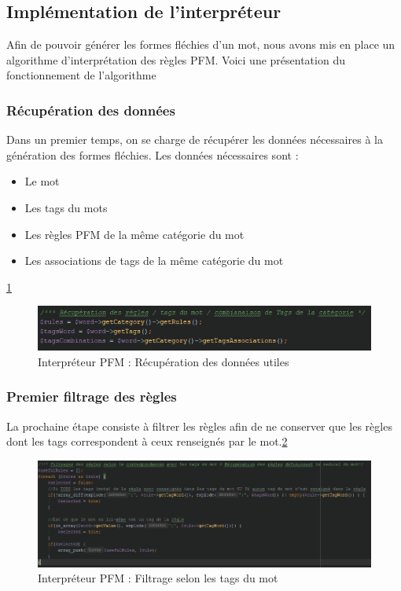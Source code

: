 \documentclass[12pt,a4paper]{article}
\begin{document}
\subsection{Implémentation de l'interpréteur}

Afin de pouvoir générer les formes fléchies d'un mot, nous avons mis en place un algorithme d'interprétation des règles PFM.
Voici une présentation du fonctionnement de l'algorithme

\subsubsection{Récupération des données}
Dans un premier temps, on se charge de récupérer les données nécessaires à la génération des formes fléchies.
Les données nécessaires sont : 
\begin{itemize} 
\item Le mot
\item Les tags du mots
\item Les règles PFM de la même catégorie du mot
\item Les associations de tags de la même catégorie du mot
\end{itemize}
\ref{PFM1}
\smallbreak

\begin{figure}[h]
\centering
\includegraphics[width=150mm]{img/interpreteur_getData.PNG}
\caption{Interpréteur PFM : Récupération des données utiles}
\label{PFM1}
\end{figure}

\newpage
\subsubsection{Premier filtrage des règles}

La prochaine étape consiste à filtrer les règles afin de ne conserver que les règles dont les tags correspondent à ceux renseignés par le mot.\ref{PFM2}

\begin{figure}[h]
\centering
\includegraphics[width=150mm]{img/interpreteur_Filtrage1.PNG}
\caption{Interpréteur PFM : Filtrage selon les tags du mot}
\label{PFM2}
\end{figure}
\end{document}

